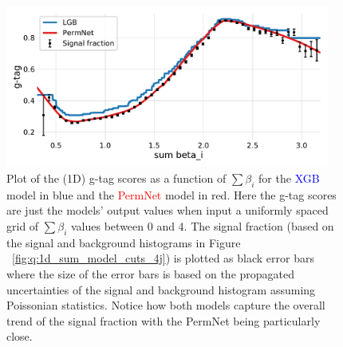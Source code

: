 \documentclass[a4paper, twoside, nobib]{tufte-book}
\newcommand{\figref}[1]{Figure ~\ref{#1}}
\begin{document}
\begin{figure}
  \includegraphics[width=0.95\textwidth, trim=10 10 10 20, clip]{figures/quarks/gtag_sum_models_njet=4-down_sample=1.00-ML_vars=vertex-selection=b-ejet_min=4-n_iter_RS_lgb=99-n_iter_RS_xgb=9-cdot_cut=0.90-version=19.pdf}
  \caption[1D Sum Models Predictions and Signal Fraction for 4-jets]
          {Plot of the (1D) g-tag scores as a function of $\sum \beta_i$ for the \textcolor{blue}{XGB} model in blue and the \textcolor{red}{PermNet} model in red. Here the g-tag scores are just the models' output values when input a uniformly spaced grid of $\sum \beta_i$ values between 0 and 4. The signal fraction (based on the signal and background histograms in \figref{fig:q:1d_sum_model_cuts_4j}) is plotted as black error bars where the size of the error bars is based on the propagated uncertainties of the signal and background histogram assuming Poissonian statistics. Notice how both models capture the overall trend of the signal fraction with the PermNet being particularly close. 
          } 
  \label{fig:q:1d_sum_models_signal_fraction_4j}
\end{figure}
\end{document}
